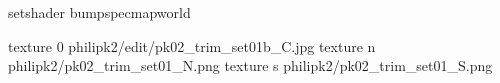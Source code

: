 setshader bumpspecmapworld

texture 0 philipk2/edit/pk02_trim_set01b_C.jpg
texture n philipk2/pk02_trim_set01_N.png
texture s philipk2/pk02_trim_set01_S.png

